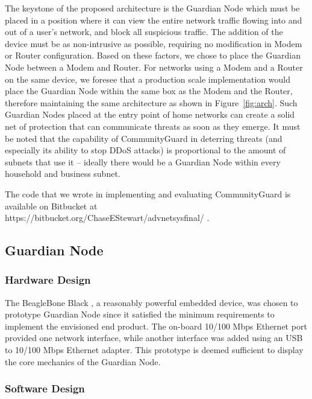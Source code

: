 The keystone of the proposed architecture is the Guardian Node which must be placed in a position where it can view the entire network traffic flowing into and out of a user's network, and block all suspicious traffic. The addition of the device must be as non-intrusive as possible, requiring no modification in Modem or Router configuration.
Based on these factors, we chose to place the Guardian Node between a Modem and Router. For networks using a Modem and a Router on the same device, we foresee that a production scale implementation would place the Guardian Node within the same box as the Modem and the Router, therefore maintaining the same architecture as shown in Figure~\ref{fig:arch}. Such Guardian Nodes placed at the entry point of home networks can create a solid net of protection that can communicate threats as soon as they emerge. It must be noted that the capability of CommunityGuard in deterring threats (and especially its ability to stop DDoS attacks) is proportional to the amount of subnets that use it -- ideally there would be a Guardian Node within every household and business subnet.

The code that we wrote in implementing and evaluating CommunityGuard is available on Bitbucket at \\ https://bitbucket.org/ChaseEStewart/advnetsysfinal/ \cite{us}.

\vfill\eject

\subsection{Guardian Node}
\label{sec:design:guardian}

\subsubsection{Hardware Design}
\label{sec:design:hardware}
The BeagleBone Black \cite{board} , a reasonably powerful embedded device, was chosen to prototype Guardian Node since it satisfied the minimum requirements to implement the envisioned end product. The on-board 10/100 Mbps Ethernet port provided one network interface, while another interface was added using an USB to 10/100 Mbps Ethernet adapter. This prototype is deemed sufficient to display the core mechanics of the Guardian Node. 

\subsubsection{Software Design}
\label{sec:design:software}

